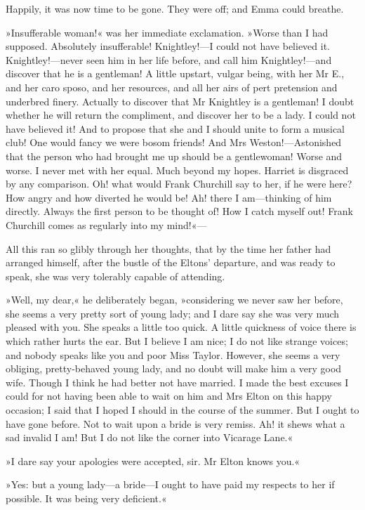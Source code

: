 Happily, it was now time to be gone. They were off; and Emma could breathe.

»Insufferable woman!« was her immediate exclamation. »Worse than I had supposed. Absolutely insufferable! Knightley!—I could not have believed it. Knightley!—never seen him in her life before, and call him Knightley!—and discover that he is a gentleman! A little upstart, vulgar being, with her Mr E., and her caro sposo, and her resources, and all her airs of pert pretension and underbred finery. Actually to discover that Mr Knightley is a gentleman! I doubt whether he will return the compliment, and discover her to be a lady. I could not have believed it! And to propose that she and I should unite to form a musical club! One would fancy we were bosom friends! And Mrs Weston!—Astonished that the person who had brought me up should be a gentlewoman! Worse and worse. I never met with her equal. Much beyond my hopes. Harriet is disgraced by any comparison. Oh! what would Frank Churchill say to her, if he were here? How angry and how diverted he would be! Ah! there I am—thinking of him directly. Always the first person to be thought of! How I catch myself out! Frank Churchill comes as regularly into my mind!«—

All this ran so glibly through her thoughts, that by the time her father had arranged himself, after the bustle of the Eltons' departure, and was ready to speak, she was very tolerably capable of attending.

»Well, my dear,« he deliberately began, »considering we never saw her before, she seems a very pretty sort of young lady; and I dare say she was very much pleased with you. She speaks a little too quick. A little quickness of voice there is which rather hurts the ear. But I believe I am nice; I do not like strange voices; and nobody speaks like you and poor Miss Taylor. However, she seems a very obliging, pretty-behaved young lady, and no doubt will make him a very good wife. Though I think he had better not have married. I made the best excuses I could for not having been able to wait on him and Mrs Elton on this happy occasion; I said that I hoped I should in the course of the summer. But I ought to have gone before. Not to wait upon a bride is very remiss. Ah! it shews what a sad invalid I am! But I do not like the corner into Vicarage Lane.«

»I dare say your apologies were accepted, sir. Mr Elton knows you.«

»Yes: but a young lady—a bride—I ought to have paid my respects to her if possible. It was being very deficient.«

